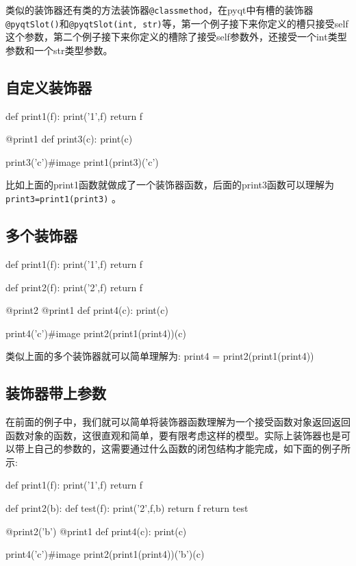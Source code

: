 \documentclass[12pt,oneside]{book}
\begin{document}
\begin{common-format}
类似的装饰器还有类的方法装饰器\verb+@classmethod+，在pyqt中有槽的装饰器\verb+@pyqtSlot()+和\verb+@pyqtSlot(int, str)+等，第一个例子接下来你定义的槽只接受self这个参数，第二个例子接下来你定义的槽除了接受self参数外，还接受一个int类型参数和一个str类型参数。


\subsection{自定义装饰器}
\begin{tcbpython}[]
def print1(f):
    print('1',f)
    return f

@print1
def print3(c):
    print(c)

print3('c')#image print1(print3)('c')
\end{tcbpython}

比如上面的print1函数就做成了一个装饰器函数，后面的print3函数可以理解为 \verb+print3=print1(print3)+ 。

\subsection{多个装饰器}
\begin{tcbpython}[]
def print1(f):
    print('1',f)
    return f

def print2(f):
    print('2',f)
    return f

@print2
@print1
def print4(c):
    print(c)

print4('c')#image print2(print1(print4))(c)
\end{tcbpython}

类似上面的多个装饰器就可以简单理解为:
print4 = print2(print1(print4))

\subsection{装饰器带上参数}
在前面的例子中，我们就可以简单将装饰器函数理解为一个接受函数对象返回返回函数对象的函数，这很直观和简单，要有限考虑这样的模型。实际上装饰器也是可以带上自己的参数的，这需要通过什么函数的闭包结构才能完成，如下面的例子所示:

\begin{tcbpython}[]
def print1(f):
    print('1',f)
    return f

def print2(b):
    def test(f):
        print('2',f,b)
        return f
    return test

@print2('b')
@print1
def print4(c):
    print(c)

print4('c')#image print2(print1(print4))('b')(c)
\end{tcbpython}


\end{common-format}
\end{document}
